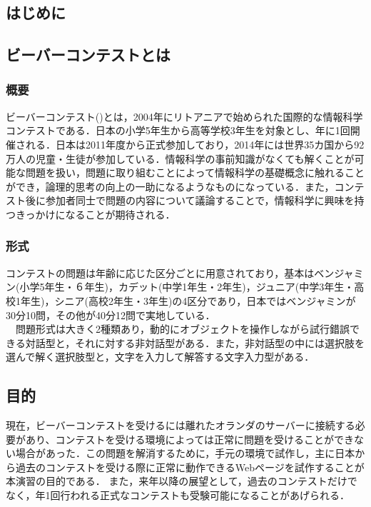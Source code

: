\documentclass[a4paper]{jarticle}
\begin{document}
\maketitle
\begin{multicols}{2}
\setcounter{page}{1}

\section{はじめに}

\subsection{ビーバーコンテストとは}
\subsubsection{概要}
ビーバーコンテスト(\cite{bebras-contest, bebras-pdf})とは，2004年にリトアニアで始められた国際的な情報科学コンテストである．日本の小学5年生から高等学校3年生を対象とし、年に1回開催される．日本は2011年度から正式参加しており，2014年には世界35カ国から92万人の児童・生徒が参加している．情報科学の事前知識がなくても解くことが可能な問題を扱い，問題に取り組むことによって情報科学の基礎概念に触れることができ，論理的思考の向上の一助になるようなものになっている．また，コンテスト後に参加者同士で問題の内容について議論することで，情報科学に興味を持つきっかけになることが期待される．

\subsubsection{形式}
 コンテストの問題は年齢に応じた区分ごとに用意されており，基本はベンジャミン(小学5年生・６年生)，カデット(中学1年生・2年生)，ジュニア(中学3年生・高校1年生)，シニア(高校2年生・3年生)の4区分であり，日本ではベンジャミンが30分10問，その他が40分12問で実地している．
\\　問題形式は大きく2種類あり，動的にオブジェクトを操作しながら試行錯誤できる対話型と，それに対する非対話型がある．また，非対話型の中には選択肢を選んで解く選択肢型と，文字を入力して解答する文字入力型がある．

\subsection{目的}
現在，ビーバーコンテストを受けるには離れたオランダのサーバーに接続する必要があり、コンテストを受ける環境によっては正常に問題を受けることができない場合があった．この問題を解消するために，手元の環境で試作し，主に日本から過去のコンテストを受ける際に正常に動作できるWebページを試作することが本演習の目的である．
また，来年以降の展望として，過去のコンテストだけでなく，年1回行われる正式なコンテストも受験可能になることがあげられる．


\end{multicols}
\end{document}
